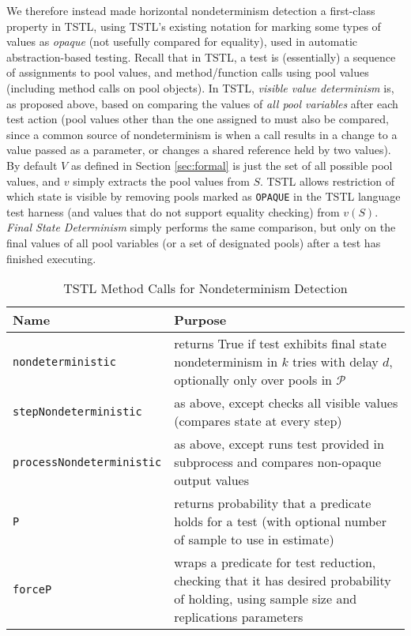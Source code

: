 We therefore instead made horizontal nondeterminism detection a first-class
property in TSTL, using TSTL's existing notation for marking some
types of values as \emph{opaque} (not usefully compared for equality),
used in automatic abstraction-based testing.  Recall that in TSTL, a
test is (essentially) a sequence of assignments to pool values,
and method/function calls using pool values (including method calls on
pool objects).  In TSTL, \emph{visible
value determinism} is, as proposed above, based on comparing the values of \emph{all pool
variables} after each test action (pool values other than the one
assigned to must also be compared, since a common source of
nondeterminism is when a call results in a change to a value passed as
a parameter, or changes a shared reference held by two values).  By
default $V$ as defined in Section \ref{sec:formal} is just the set of all possible pool values, and $v$
simply extracts the pool values from $S$.
TSTL allows restriction of which state is visible by removing pools marked as {\tt OPAQUE} in the
TSTL language test harness (and values that do not support equality
checking) from $v(S)$.  \emph{Final State Determinism} simply performs the same
comparison, but only on the final values of all pool variables (or a
set of designated pools) after a test has
finished executing.


\begin{table*}
\centering
{\scriptsize 

\caption{TSTL Method Calls for Nondeterminism Detection}
\label{tab:methods}
\begin{tabular}{l|p{8cm}}
Name & Purpose \\
\hline
\hline
{\tt nondeterministic} & returns True if test exhibits final state nondeterminism in $k$
  tries with delay $d$, optionally only over pools in $\mathcal{P}$\\
\hline
{\tt stepNondeterministic} & as above, except checks all visible values
                       (compares state at every step)\\
\hline
{\tt processNondeterministic} & as above, except runs test provided in
                          subprocess and compares non-opaque output
                          values \\
\hline
{\tt P} & returns probability that a predicate holds for a test (with
          optional number of sample to use in estimate) \\
\hline
{\tt forceP} & wraps a predicate for test reduction, checking that it
               has desired probability of holding, using
         sample size and replications parameters \\
\hline
\hline

\end{tabular}
}
\end{table*}


